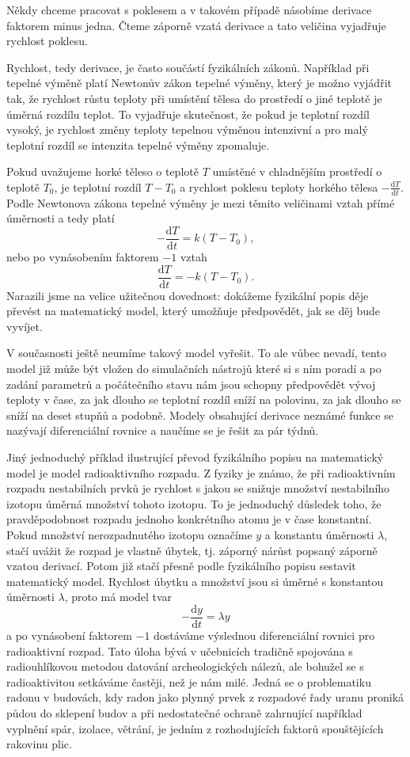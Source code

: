 \documentclass[12pt]{article}
\begin{document}
Někdy chceme pracovat s poklesem a v takovém případě násobíme derivace faktorem minus jedna. Čteme záporně vzatá derivace a tato veličina vyjadřuje rychlost poklesu.

Rychlost, tedy derivace, je často součástí fyzikálních zákonů. Například při tepelné výměně platí Newtonův zákon tepelné výměny, který je možno vyjádřit tak, že rychlost růstu teploty při umístění tělesa do prostředí o jiné teplotě je úměrná rozdílu teplot. To vyjadřuje skutečnost, že pokud je teplotní rozdíl vysoký, je rychlost změny teploty tepelnou výměnou intenzivní a pro malý teplotní rozdíl se intenzita tepelné výměny zpomaluje. 

Pokud uvažujeme horké těleso o teplotě $T$ umístěné v chladnějším prostředí o teplotě $T_0$, je teplotní rozdíl $T-T_0$ a rychlost poklesu teploty horkého tělesa $-\frac{\mathrm dT}{\mathrm dt}.$ Podle Newtonova zákona tepelné výměny je mezi těmito veličinami vztah přímé úměrnosti a tedy platí $$-\frac {\mathrm dT}{\mathrm dt}=k(T-{T_0}),$$
nebo po vynásobením faktorem $-1$ vztah
$$\frac {\mathrm dT}{\mathrm dt}=-k(T-T_0).$$ Narazili jsme na velice užitečnou dovednost: dokážeme fyzikální popis děje převést na matematický model, který umožňuje předpovědět, jak se děj bude vyvíjet.

V současnosti ještě neumíme takový model vyřešit. To ale vůbec nevadí, tento model již může být vložen do simulačních nástrojů které si s ním poradí a po zadání parametrů a počátečního stavu nám jsou schopny předpovědět vývoj teploty v čase, za jak dlouho se teplotní rozdíl sníží na polovinu, za jak dlouho se sníží na deset stupňů a podobně. Modely obsahující derivace neznámé funkce se nazývají diferenciální rovnice a naučíme se je řešit za pár týdnů.

Jiný jednoduchý příklad ilustrující převod fyzikálního popisu na matematický model je model radioaktivního rozpadu. Z fyziky je známo, že při radioaktivním rozpadu nestabilních prvků je rychlost s jakou se snižuje množství nestabilního izotopu úměrná množství tohoto izotopu. To je jednoduchý důsledek toho, že pravděpodobnost rozpadu jednoho konkrétního atomu je v čase konstantní. Pokud množství nerozpadnutého izotopu označíme $y$ a konstantu úměrnosti $\lambda$, stačí uvážit že rozpad je vlastně úbytek, tj. záporný nárůst popsaný záporně vzatou derivací. Potom již stačí přesně podle fyzikálního popisu sestavit matematický model. Rychlost úbytku a množství jsou si úměrné s konstantou úměrnosti $\lambda$, proto má model tvar $$-\frac{\mathrm dy}{\mathrm dt}=\lambda y$$ a po vynásobení faktorem $-1$ dostáváme výslednou diferenciální rovnici pro radioaktivní rozpad. Tato úloha bývá v učebnicích tradičně spojována s radiouhlíkovou metodou datování archeologických nálezů, ale bohužel se s radioaktivitou setkáváme častěji, než je nám milé. Jedná se o problematiku radonu v budovách, kdy radon jako plynný prvek z rozpadové řady uranu proniká půdou do sklepení budov a při nedostatečné ochraně zahrnující například vyplnění spár, izolace, větrání, je jedním z rozhodujících faktorů spouštějících rakovinu plic.
\end{document}
